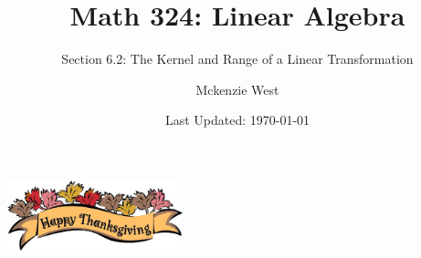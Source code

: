 \documentclass{beamer}
\theoremstyle{definition}
\begin{document}
	\title{Math 324: Linear Algebra}
	\subtitle{Section 6.2: The Kernel and Range of a Linear Transformation}
	\author{Mckenzie West}
	\date{Last Updated: \today}
\begin{frame}[fragile]
\maketitle	
\begin{center}
	\includegraphics[width=2in]{images/thanksgiving1}
\end{center}
\end{frame}
\end{document}
